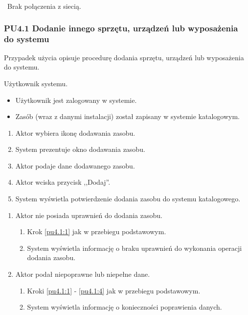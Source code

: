 \
Brak połączenia z siecią.

\subsubsection{PU4.1 Dodanie innego sprzętu, urządzeń lub wyposażenia do systemu}

Przypadek użycia opisuje procedurę dodania sprzętu, urządzeń lub wyposażenia do systemu.

Użytkownik systemu.

\begin{itemize}
\item Użytkownik jest zalogowany w systemie.
\end{itemize}

\begin{itemize}
\item Zasób (wraz z danymi instalacji) został zapisany w systemie katalogowym.
\end{itemize}

\begin{enumerate}
\item \label{pu4.1:1} Aktor wybiera ikonę dodawania zasobu.
\item System prezentuje okno dodawania zasobu.
\item Aktor podaje dane dodawanego zasobu.
\item \label{pu4.1:4} Aktor wciska przycisk ,,Dodaj''.
\item System wyświetla potwierdzenie dodania zasobu do systemu katalogowego.
\end{enumerate}

\begin{enumerate}
\item Aktor nie posiada uprawnień do dodania zasobu.
	\begin{enumerate}[label*=\arabic*.]
		\item Krok \ref{pu4.1:1} jak w przebiegu podstawowym.
		\item System wyświetla informację o braku uprawnień do wykonania operacji dodania zasobu.
	\end{enumerate}
\item Aktor podał niepoprawne lub niepełne dane.
	\begin{enumerate}[label*=\arabic*.]
		\item Kroki \ref{pu4.1:1} - \ref{pu4.1:4} jak w przebiegu podstawowym.
		\item System wyświetla informację o konieczności poprawienia danych.
	\end{enumerate}
\end{enumerate}

